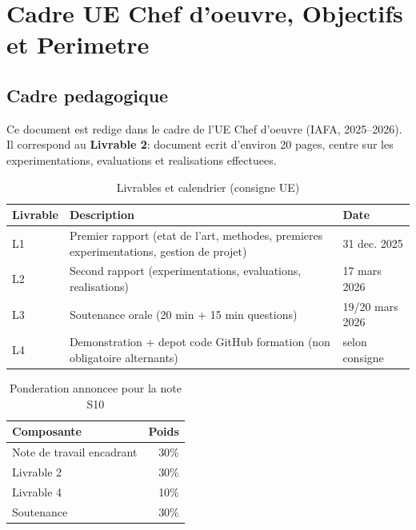﻿\chapter{Cadre UE Chef d'oeuvre, Objectifs et Perimetre}

\section{Cadre pedagogique}
Ce document est redige dans le cadre de l'UE Chef d'oeuvre (IAFA, 2025--2026).
Il correspond au \textbf{Livrable 2}: document ecrit d'environ 20 pages,
centre sur les experimentations, evaluations et realisations effectuees.

\begin{table}[H]
  \centering
  \caption{Livrables et calendrier (consigne UE)}
  \begin{tabular}{p{2.1cm}p{8.4cm}p{3.2cm}}
    \toprule
    Livrable & Description & Date \\
    \midrule
    L1 & Premier rapport (etat de l'art, methodes, premieres experimentations, gestion de projet) & 31 dec. 2025 \\
    L2 & Second rapport (experimentations, evaluations, realisations) & 17 mars 2026 \\
    L3 & Soutenance orale (20 min + 15 min questions) & 19/20 mars 2026 \\
    L4 & Demonstration + depot code GitHub formation (non obligatoire alternants) & selon consigne \\
    \bottomrule
  \end{tabular}
\end{table}

\begin{table}[H]
  \centering
  \caption{Ponderation annoncee pour la note S10}
  \begin{tabular}{lr}
    \toprule
    Composante & Poids \\
    \midrule
    Note de travail encadrant & 30\% \\
    Livrable 2 & 30\% \\
    Livrable 4 & 10\% \\
    Soutenance & 30\% \\
    \bottomrule
  \end{tabular}
\end{table}

